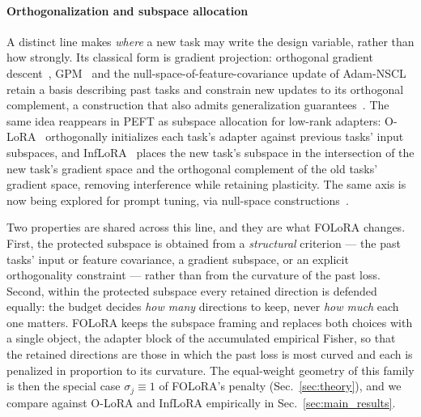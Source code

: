 \paragraph{Orthogonalization and subspace allocation}
A distinct line makes \emph{where} a new task may write the design variable, rather than
how strongly. Its classical form is gradient projection: orthogonal gradient
descent~\cite{farajtabar2020orthogonal}, GPM~\cite{saha2021gradient} and the
null-space-of-feature-covariance update of Adam-NSCL~\cite{wang2021adamnsc} retain a basis
describing past tasks and constrain new updates to its orthogonal complement, a
construction that also admits generalization guarantees~\cite{bennani2019generalisation}.
The same idea reappears in PEFT as subspace allocation for low-rank adapters:
O-LoRA~\cite{wang2023olora} orthogonally initializes each task's adapter against previous
tasks' input subspaces, and InfLoRA~\cite{liang2024inflora} places the new task's subspace
in the intersection of the new task's gradient space and the orthogonal complement of the
old tasks' gradient space, removing interference while retaining plasticity. The same axis
is now being explored for prompt tuning, via null-space
constructions~\cite{lu2024nsp2}.

Two properties are shared across this line, and they are what FOLoRA changes. First, the
protected subspace is obtained from a \emph{structural} criterion --- the past tasks'
input or feature covariance, a gradient subspace, or an explicit orthogonality constraint
--- rather than from the curvature of the past loss. Second, within the protected subspace
every retained direction is defended equally: the budget decides \emph{how many}
directions to keep, never \emph{how much} each one matters. FOLoRA keeps the subspace
framing and replaces both choices with a single object, the adapter block of the
accumulated empirical Fisher, so that the retained directions are those in which the past
loss is most curved and each is penalized in proportion to its curvature. The equal-weight
geometry of this family is then the special case $\sigma_j\equiv1$ of FOLoRA's penalty
(Sec.~\ref{sec:theory}), and we compare against O-LoRA and InfLoRA empirically in
Sec.~\ref{sec:main_results}.

